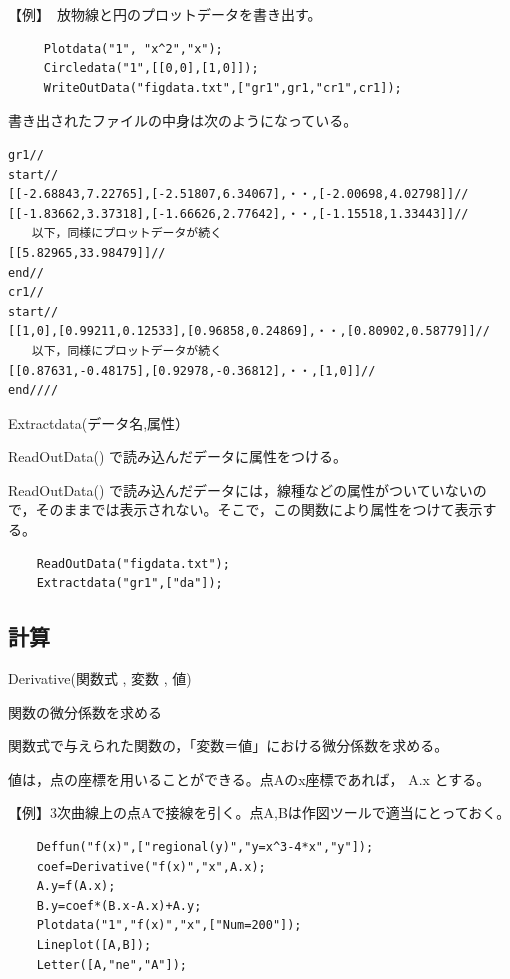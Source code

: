\documentclass[papersize,a4paper,12pt,uplatex]{jsarticle}
\begin{document}
\begin{description}
【例】　放物線と円のプロットデータを書き出す。

\begin{verbatim}
     Plotdata("1", "x^2","x");
     Circledata("1",[[0,0],[1,0]]);
     WriteOutData("figdata.txt",["gr1",gr1,"cr1",cr1]);
\end{verbatim}

書き出されたファイルの中身は次のようになっている。

\begin{verbatim}
gr1// 
start//
[[-2.68843,7.22765],[-2.51807,6.34067],・・,[-2.00698,4.02798]]//
[[-1.83662,3.37318],[-1.66626,2.77642],・・,[-1.15518,1.33443]]//
　　以下，同様にプロットデータが続く
[[5.82965,33.98479]]//
end//
cr1//
start//
[[1,0],[0.99211,0.12533],[0.96858,0.24869],・・,[0.80902,0.58779]]//
　　以下，同様にプロットデータが続く
[[0.87631,-0.48175],[0.92978,-0.36812],・・,[1,0]]//
end////
\end{verbatim}

\vspace{\baselineskip}
\hypertarget{extractdata}{}
\item[関数]  Extractdata(データ名,属性）
\item[機能]  ReadOutData() で読み込んだデータに属性をつける。
\item[説明]  ReadOutData() で読み込んだデータには，線種などの属性がついていないので，そのままでは表示されない。そこで，この関数により属性をつけて表示する。
\begin{verbatim}
    ReadOutData("figdata.txt");
    Extractdata("gr1",["da"]);
\end{verbatim}


\newpage
\subsection{計算}

\begin{description}

\hypertarget{derivative}{}
\item[関数]  Derivative(関数式 , 変数 , 値)
\item[機能]  関数の微分係数を求める
\item[説明]  関数式で与えられた関数の，「変数＝値」における微分係数を求める。

値は，点の座標を用いることができる。点Aのx座標であれば， A.x とする。

\vspace{\baselineskip}
【例】3次曲線上の点Aで接線を引く。点A,Bは作図ツールで適当にとっておく。
\begin{verbatim}
    Deffun("f(x)",["regional(y)","y=x^3-4*x","y"]);
    coef=Derivative("f(x)","x",A.x);
    A.y=f(A.x);
    B.y=coef*(B.x-A.x)+A.y;
    Plotdata("1","f(x)","x",["Num=200"]);
    Lineplot([A,B]);
    Letter([A,"ne","A"]);
\end{verbatim}
    \begin{center}  \end{center}



\end{description}
\end{description}
\end{document}
